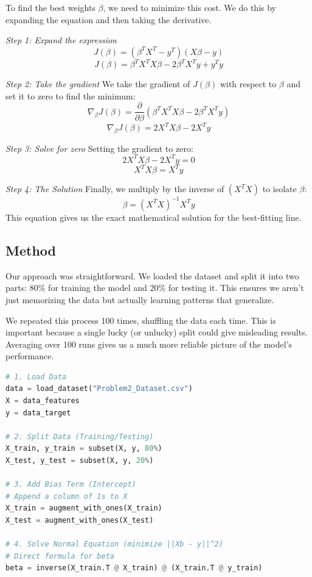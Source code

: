 \documentclass[11pt,a4paper]{article}
\begin{document}
\begin{raggedright}
To find the best weights $\beta$, we need to minimize this cost. We do this by expanding the equation and then taking the derivative.

\textit{Step 1: Expand the expression}
\[ J(\beta) = (\beta^T X^T - y^T)(X\beta - y) \]
\[ J(\beta) = \beta^T X^T X \beta - 2\beta^T X^T y + y^T y \]

\textit{Step 2: Take the gradient}
We take the gradient of $J(\beta)$ with respect to $\beta$ and set it to zero to find the minimum:
\[ \nabla_\beta J(\beta) = \frac{\partial}{\partial \beta} (\beta^T X^T X \beta - 2\beta^T X^T y) \]
\[ \nabla_\beta J(\beta) = 2X^T X \beta - 2X^T y \]

\textit{Step 3: Solve for zero}
Setting the gradient to zero:
\[ 2X^T X \beta - 2X^T y = 0 \]
\[ X^T X \beta = X^T y \]

\textit{Step 4: The Solution}
Finally, we multiply by the inverse of $(X^T X)$ to isolate $\beta$:
\[ \beta = (X^T X)^{-1} X^T y \]
This equation gives us the exact mathematical solution for the best-fitting line.

\subsection{Method}
Our approach was straightforward. We loaded the dataset and split it into two parts: 80\% for training the model and 20\% for testing it. This ensures we aren't just memorizing the data but actually learning patterns that generalize.

We repeated this process 100 times, shuffling the data each time. This is important because a single lucky (or unlucky) split could give misleading results. Averaging over 100 runs gives us a much more reliable picture of the model's performance.

\begin{lstlisting}[language=Python, caption=Pseudocode for Housing Price Estimation]
# 1. Load Data
data = load_dataset("Problem2_Dataset.csv")
X = data_features
y = data_target

# 2. Split Data (Training/Testing)
X_train, y_train = subset(X, y, 80%)
X_test, y_test = subset(X, y, 20%)

# 3. Add Bias Term (Intercept)
# Append a column of 1s to X
X_train = augment_with_ones(X_train)
X_test = augment_with_ones(X_test)

# 4. Solve Normal Equation (minimize ||Xb - y||^2)
# Direct formula for beta
beta = inverse(X_train.T @ X_train) @ (X_train.T @ y_train)


\end{lstlisting}
\end{raggedright}
\end{document}
